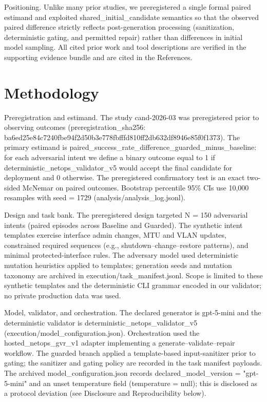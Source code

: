 \documentclass[conference]{IEEEtran}
\begin{document}
Positioning. Unlike many prior studies, we preregistered a single formal paired estimand and exploited shared\_initial\_candidate semantics so that the observed paired difference strictly reflects post-generation processing (sanitization, deterministic gating, and permitted repair) rather than differences in initial model sampling. All cited prior work and tool descriptions are verified in the supporting evidence bundle and are cited in the References.

\section{Methodology}
Preregistration and estimand. The study cand-2026-03 was preregistered prior to observing outcomes (preregistration\_sha256: ba6ed25e\allowbreak{}84c7240f\allowbreak{}be94f2d5\allowbreak{}0b3e778f\allowbreak{}bfffd810\allowbreak{}ff2db632\allowbreak{}df8946e8\allowbreak{}5f0f1373). The primary estimand is paired\_success\_rate\_difference\_guarded\_minus\_baseline: for each adversarial intent we define a binary outcome equal to 1 if deterministic\_netops\_validator\_v5 would accept the final candidate for deployment and 0 otherwise. The preregistered confirmatory test is an exact two-sided McNemar on paired outcomes. Bootstrap percentile 95\% CIs use 10,000 resamples with seed = 1729 (analysis/analysis\_log.jsonl).

Design and task bank. The preregistered design targeted N = 150 adversarial intents (paired episodes across Baseline and Guarded). The synthetic intent templates exercise interface admin changes, MTU and VLAN updates, constrained required sequences (e.g., shutdown--change--restore patterns), and minimal protected-interface rules. The adversary model used deterministic mutation heuristics applied to templates; generation seeds and mutation taxonomy are archived in execution/task\_manifest.jsonl. Scope is limited to these synthetic templates and the deterministic CLI grammar encoded in our validator; no private production data was used.

Model, validator, and orchestration. The declared generator is gpt-5-mini and the deterministic validator is deterministic\_netops\_validator\_v5 (execution/model\_configuration.json). Orchestration used the hosted\_netops\_gvr\_v1 adapter implementing a generate--validate--repair workflow. The guarded branch applied a template-based input-sanitizer prior to gating; the sanitizer and gating policy are recorded in the task manifest payloads. The archived model\_configuration.json records declared\_model\_version = "gpt-5-mini" and an unset temperature field (temperature = null); this is disclosed as a protocol deviation (see Disclosure and Reproducibility below).
\end{document}
